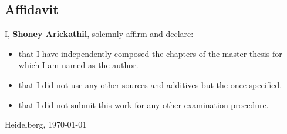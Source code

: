 
\begin{titlepage}
\section*{Affidavit}


I, \textbf{Shoney Arickathil}, solemnly affirm and declare:

\begin{itemize}
    \item that I have independently composed the chapters of the master thesis for which I am named as the author.
    \item that I did not use any other sources and additives but the once specified. 
    \item that I did not submit this work for any other examination procedure. 
\end{itemize}


\vspace*{5\baselineskip}


Heidelberg, \today \hspace*{1mm} \hrulefill

\end{titlepage}
